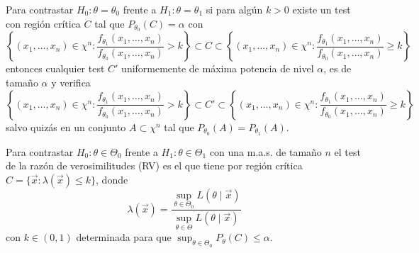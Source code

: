 \begin{teorema}
    Para contrastar $H_0: \theta = \theta_0$ frente a $H_1: \theta = \theta_1$ si para algún $k > 0$ existe un test con región crítica $C$ tal que $P_{\theta_0}(C) = \alpha$ con
    $$\left\{(x_1, \ldots, x_n) \in \chi^n : \frac{f_{\theta_1}(x_1, \ldots, x_n)}{f_{\theta_0}(x_1, \ldots, x_n)} > k \right\} \subset C \subset \left\{(x_1, \ldots, x_n) \in \chi^n : \frac{f_{\theta_1}(x_1, \ldots, x_n)}{f_{\theta_0}(x_1, \ldots, x_n)} \geq k \right\} $$
    entonces cualquier test $C \prime$ uniformemente de máxima potencia de nivel $\alpha$, es de tamaño $\alpha$ y verifica
    $$\left\{(x_1, \ldots, x_n) \in \chi^n : \frac{f_{\theta_1}(x_1, \ldots, x_n)}{f_{\theta_0}(x_1, \ldots, x_n)} > k \right\} \subset C\prime \subset \left\{(x_1, \ldots, x_n) \in \chi^n : \frac{f_{\theta_1}(x_1, \ldots, x_n)}{f_{\theta_0}(x_1, \ldots, x_n)} \geq k \right\} $$
    salvo quizás en un conjunto $A \subset \chi^n$ tal que $P_{\theta_0}(A) = P_{\theta_1}(A)$.
\end{teorema}

\begin{definición}
    Para contrastar $H_0: \theta \in \Theta_0$ frente a $H_1: \theta \in \Theta_1$ con una m.a.s. de tamaño $n$ el test de la razón de verosimilitudes (RV) es el que tiene por región crítica $C = \{\vec{x} : \lambda(\vec{x}) \leq k\}$, donde
    $$\lambda(\vec{x}) = \frac{\sup_{\theta \in \Theta_0} L(\theta \mid \vec{x})}{\sup_{\theta \in \Theta} L(\theta \mid \vec{x})}$$
    con $k \in (0,1)$ determinada para que $\sup_{\theta \in \Theta_0} P_{\theta}(C) \leq \alpha$. 
\end{definición}

